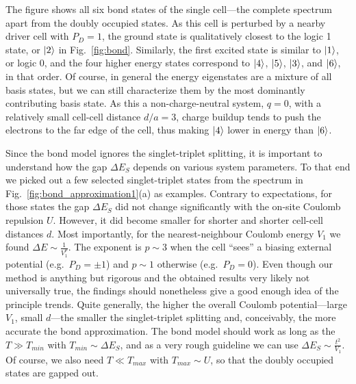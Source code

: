 The figure shows all six bond states of the single cell---the complete spectrum
apart from the doubly occupied states. As this cell is perturbed by a nearby
driver cell with $P_D = 1$, the ground state is qualitatively closest to the
logic 1 state, or $\left|2\right>$ in Fig.~\ref{fig:bond}. Similarly, the first excited
state is similar to $\left|1\right>$, or logic 0, and the four higher energy states
correspond to $\left|4\right>$, $\left|5\right>$, $\left|3\right>$, and $\left|6\right>$, in that order. Of
course, in general the energy eigenstates are a mixture of all basis states, but
we can still characterize them by the most dominantly contributing basis state.
As this a non-charge-neutral system, $q=0$, with a relatively small cell-cell
distance $d/a = 3$, charge buildup tends to push the electrons to the far edge
of the cell, thus making $\left|4\right>$ lower in energy than $\left|6\right>$.

Since the bond model ignores the singlet-triplet splitting, it is important to
understand how the gap $\Delta E_S$ depends on various system parameters. To
that end we picked out a few selected singlet-triplet states from the spectrum
in Fig.~\ref{fig:bond_approximation1}(a) as examples. Contrary to expectations,
for those states the gap $\Delta E_S$ did not change significantly with the
on-site Coulomb repulsion $U$. However, it did become smaller for shorter and
shorter cell-cell distances $d$. Most importantly, for the nearest-neighbour
Coulomb energy $V_1$ we found $\Delta E \sim \frac{1}{V_1^p}$. The exponent is
$p \sim 3$ when the cell ``sees'' a biasing external potential (e.g.\ $P_D = \pm
1$) and $p \sim 1$ otherwise (e.g.\ $P_D = 0$). Even though our method is
anything but rigorous and the obtained results very likely not universally true,
the findings should nonetheless give a good enough idea of the principle trends.
Quite generally, the higher the overall Coulomb potential---large $V_1$, small
$d$---the smaller the singlet-triplet splitting and, conceivably, the more
accurate the bond approximation. The bond model should work as long as the $T
\gg T_{min}$ with $T_{min} \sim \Delta E_S$, and as a very rough guideline we can
use $\Delta E_S \sim \frac{t^2}{V_1}$. Of course, we also need $T \ll T_{max}$
with $T_{max} \sim U$, so that the doubly occupied states are gapped out.

